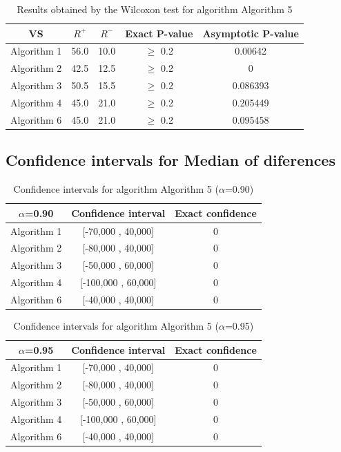 \documentclass[a4paper,10pt]{article}
\begin{document}
\begin{table}[!htp]
\centering\small
\begin{tabular}{
|c|c|c|c|c|}
\hline
 VS & $R^{+}$ & $R^{-}$ & Exact P-value & Asymptotic P-value \\ \hline 
Algorithm 1 & 56.0 & 10.0 & $\geq$ 0.2 & 0.00642\\ \hline 
Algorithm 2 & 42.5 & 12.5 & $\geq$ 0.2 & 0\\ \hline 
Algorithm 3 & 50.5 & 15.5 & $\geq$ 0.2 & 0.086393\\ \hline 
Algorithm 4 & 45.0 & 21.0 & $\geq$ 0.2 & 0.205449\\ \hline 
Algorithm 6 & 45.0 & 21.0 & $\geq$ 0.2 & 0.095458\\ \hline 

\end{tabular}
\caption{Results obtained by the Wilcoxon test for algorithm Algorithm 5}
\end{table}

\subsection{Confidence intervals for Median of diferences}

\begin{table}[!htp]
\centering\small
\begin{tabular}{
|c|c|c|}
\hline
 $\alpha$=0.90 & Confidence interval & Exact confidence \\ \hline 
Algorithm 1 & [-70,000 , 40,000] & 0\\ \hline 
Algorithm 2 & [-80,000 , 40,000] & 0\\ \hline 
Algorithm 3 & [-50,000 , 60,000] & 0\\ \hline 
Algorithm 4 & [-100,000 , 60,000] & 0\\ \hline 
Algorithm 6 & [-40,000 , 40,000] & 0\\ \hline 

\end{tabular}
\caption{Confidence intervals for algorithm Algorithm 5 ($\alpha$=0.90)}
\end{table}
\begin{table}[!htp]
\centering\small
\begin{tabular}{
|c|c|c|}
\hline
 $\alpha$=0.95 & Confidence interval & Exact confidence \\ \hline 
Algorithm 1 & [-70,000 , 40,000] & 0\\ \hline 
Algorithm 2 & [-80,000 , 40,000] & 0\\ \hline 
Algorithm 3 & [-50,000 , 60,000] & 0\\ \hline 
Algorithm 4 & [-100,000 , 60,000] & 0\\ \hline 
Algorithm 6 & [-40,000 , 40,000] & 0\\ \hline 

\end{tabular}
\caption{Confidence intervals for algorithm Algorithm 5 ($\alpha$=0.95)}
\end{table}
\end{document}
